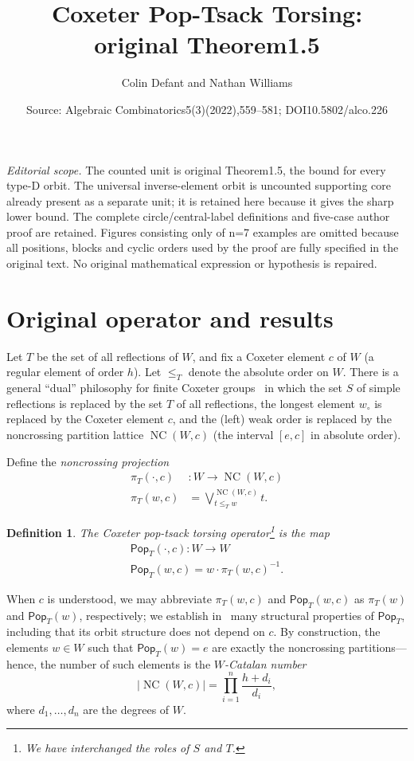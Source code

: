 \documentclass[10pt,a4paper]{amsart}
\title[Type-D pop-tsack termination]{Coxeter Pop-Tsack Torsing: original Theorem1.5}
\author{Colin Defant and Nathan Williams}
\date{Source: Algebraic Combinatorics5(3)(2022),559--581; DOI10.5802/alco.226}
\newtheorem{defi}[defi]{Definition}
\newcommand{\darkblue}{\color{darkblue}}
\newcommand{\defn}[1]{\emph{\darkblue #1}}
\newcommand{\pop}{\mathsf{Pop}}
\newcommand{\wo}{w_\circ}
\DeclareMathOperator{\NC}{NC}
\begin{document}
\maketitle
\noindent\textit{Editorial scope.} The counted unit is original Theorem1.5, the bound for every type-D orbit. The universal inverse-element orbit is uncounted supporting core already present as a separate unit; it is retained here because it gives the sharp lower bound. The complete circle/central-label definitions and five-case author proof are retained. Figures consisting only of n=7 examples are omitted because all positions, blocks and cyclic orders used by the proof are fully specified in the original text. No original mathematical expression or hypothesis is repaired.
\section{Original operator and results}
\setcounter{equation}{2}
Let $T$ be the set of all reflections of $W$, and fix a Coxeter element $c$ of $W$ (a regular element of order $h$).  Let $\leq_T$ denote the absolute order on $W$. There is a general ``dual'' philosophy for finite Coxeter groups~\cite{bessis2003dual} in which the set $S$ of simple reflections is replaced by the set $T$ of all reflections, the longest element $\wo$ is replaced by the Coxeter element $c$, and the (left) weak order is replaced by the noncrossing partition lattice $\NC(W,c)$ (the interval $[e,c]$ in absolute order).

Define the \defn{noncrossing projection}
\begin{align}\label{EqNCProj}
\pi_T(\cdot,c)&:W \to \NC(W,c) \nonumber\\
\pi_T(w,c) &= \bigvee_{t \leq_T w}^{\NC(W,c)} t.
\end{align}

\setcounter{theorem}{1}
\begin{defi}
\label{def:dual_pop_stack}
The \defn{Coxeter pop-tsack torsing operator}\footnote{We have interchanged the roles of $S$ and $T$.} is the map
\begin{gather*}
 \pop_T(\cdot,c):W\to W \nonumber \\
\pop_T(w,c) = w \cdot \pi_T(w,c)^{-1}.
\end{gather*}
\end{defi}

When $c$ is understood, we may abbreviate $\pi_T(w,c)$ and $\pop_T(w,c)$ as $\pi_T(w)$ and $\pop_T(w)$, respectively; we establish in~ many structural properties of $\pop_T$, including that its orbit structure does not depend on $c$.  
By construction, the elements $w\in W$ such that $\pop_T(w)=e$ are exactly the noncrossing partitions---hence, the number of such elements is the \defn{$W$-Catalan number} 
\[
\left|\NC(W,c)\right|=\prod_{i=1}^n \frac{h+d_i}{d_i},
\]
 where $d_1,\ldots,d_n$ are the degrees of $W$.
\end{document}
